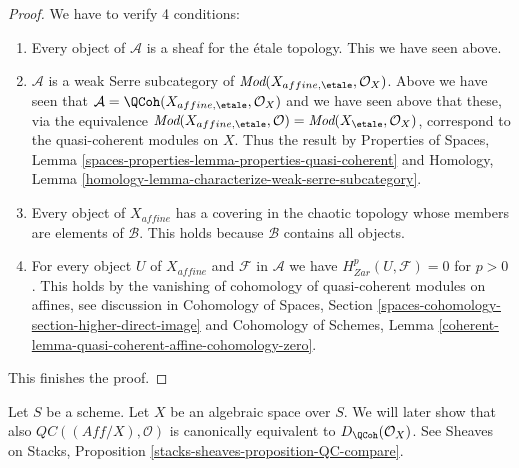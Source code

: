 \begin{proof}
\medskip\noindent
We have to verify 4 conditions:
\begin{enumerate}
\item Every object of $\mathcal{A}$ is a sheaf for the \'etale topology.
This we have seen above.
\item $\mathcal{A}$ is a weak Serre subcategory of
$\textit{Mod}(X_{affine, \etale}, \mathcal{O}_X)$. Above we have
seen that $\mathcal{A} = \QCoh(X_{affine, \etale}, \mathcal{O}_X)$ and
we have seen above that these,
via the equivalence $\textit{Mod}(X_{affine, \etale}, \mathcal{O}) =
\textit{Mod}(X_\etale, \mathcal{O}_X)$, correspond to the quasi-coherent
modules on $X$. Thus the result by Properties of Spaces, Lemma
\ref{spaces-properties-lemma-properties-quasi-coherent} and
Homology, Lemma \ref{homology-lemma-characterize-weak-serre-subcategory}.
\item Every object of $X_{affine}$ has a covering in the chaotic
topology whose members are elements of $\mathcal{B}$. This holds
because $\mathcal{B}$ contains all objects.
\item For every object $U$ of $X_{affine}$ and $\mathcal{F}$ in $\mathcal{A}$
we have $H^p_{Zar}(U, \mathcal{F}) = 0$ for $p > 0$.
This holds by the vanishing of cohomology of quasi-coherent modules
on affines, see discussion in Cohomology of Spaces, Section
\ref{spaces-cohomology-section-higher-direct-image} and
Cohomology of Schemes, Lemma
\ref{coherent-lemma-quasi-coherent-affine-cohomology-zero}.
\end{enumerate}
This finishes the proof.
\end{proof}

\begin{remark}
\label{remark-QC-compare}
Let $S$ be a scheme. Let $X$ be an algebraic space over $S$.
We will later show that also
$\mathit{QC}((\textit{Aff}/X), \mathcal{O})$
is canonically equivalent to $D_\QCoh(\mathcal{O}_X)$.
See Sheaves on Stacks, Proposition \ref{stacks-sheaves-proposition-QC-compare}.
\end{remark}













